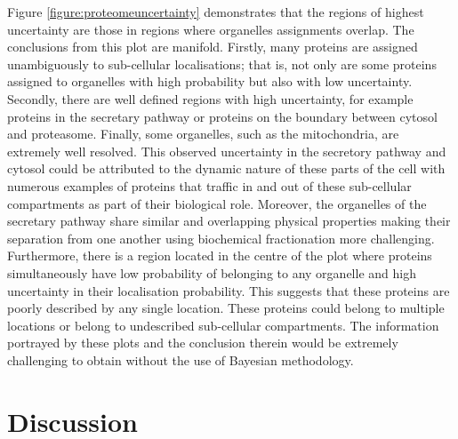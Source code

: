 \documentclass[12pt,english]{article}
\begin{document}
Figure \ref{figure:proteomeuncertainty} demonstrates that the regions
of highest uncertainty are those in regions where organelles assignments
overlap. The conclusions from this plot are manifold. Firstly, many proteins are
assigned unambiguously to sub-cellular localisations; that is, not only
are some proteins assigned to organelles with high probability but also with
low uncertainty. Secondly, there are well defined regions with high uncertainty,
for example proteins in the secretary pathway or proteins on the boundary
between cytosol and proteasome. Finally, some organelles, such as the mitochondria,
are extremely well resolved. This observed uncertainty in the secretory pathway and cytosol
could be attributed to the dynamic nature of these parts of the cell with numerous examples of proteins
that traffic in and out of these sub-cellular compartments as part of their biological role. Moreover, the organelles of the secretary pathway share similar and overlapping physical properties making their separation from one another using biochemical fractionation more challenging.
Furthermore, there is a region
located in the centre of the plot where proteins simultaneously have low probability
of belonging to any organelle and high uncertainty in their localisation probability.
This suggests that these
proteins are poorly described by any single location. These proteins could belong to multiple
locations or belong to undescribed sub-cellular compartments. The information
portrayed by these plots and the conclusion therein would be extremely challenging
to obtain without the use of Bayesian methodology.


\clearpage
\section{Discussion}
\end{document}

